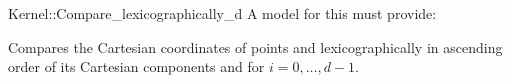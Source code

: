 \begin{ccRefFunctionObjectConcept}{Kernel::Compare_lexicographically_d}
A model for this must provide:


{Compares the Cartesian coordinates of points  and
  lexicographically in ascending order of its Cartesian 
 components  and  for $i = 0,\ldots,d-1$.}

\end{ccRefFunctionObjectConcept}
